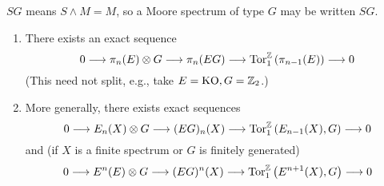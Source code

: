 \documentclass[../main]{subfiles}
\begin{document}
\begin{example}
$SG$ means $S\wedge M = M$, so a Moore spectrum of type $G$ may be written $SG$.
\end{example}

\begin{proposition}\label{prop:p3c06.6}
\begin{enumerate}
    \item There exists an exact sequence
    \[0\longrightarrow \pi_n(E)\otimes G \longrightarrow \pi_n(EG) \longrightarrow \mathrm{Tor}_1^{\mathbb{Z}} \left(\pi_{n-1}(E)\right) \longrightarrow 0\]
    (This need not split, e.g., take $E=\mathrm{KO}, G=\mathbb{Z}_2$.)
    \item More generally, there exists exact sequences
    \[0\longrightarrow E_n(X)\otimes G \longrightarrow (EG)_n(X)\longrightarrow \mathrm{Tor}_1^{\mathbb{Z}} \left(E_{n-1}(X), G\right) \longrightarrow 0\]
    and (if $X$ is a finite spectrum or $G$ is finitely generated)
    \[0\longrightarrow E^n(E)\otimes G \longrightarrow (EG)^n(X)\longrightarrow \mathrm{Tor}_1^{\mathbb{Z}} \left(E^{n+1}(X), G\right) \longrightarrow 0\]
\end{enumerate}
\end{proposition}
\end{document}
